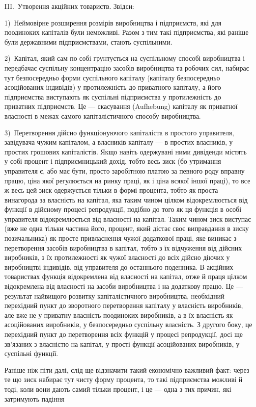 \parcont{}  %

III.~Утворення акційних товариств. Звідси:

1)~Неймовірне розширення розмірів виробництва і підприємств, які для поодиноких капіталів були
неможливі. Разом з тим
такі підприємства, які раніше були державними підприємствами,
стають суспільними.

2)~Капітал, який сам по собі грунтується на суспільному
способі виробництва і передбачає суспільну концентрацію засобів виробництва та робочих сил, набирає
тут безпосередньо
форми суспільного капіталу (капіталу безпосередньо асоційованих індивідів) у протилежність до
приватного капіталу, а його
підприємства виступають як суспільні підприємства у протилежність до приватних підприємств. Це —
скасування (Aufhebung)
капіталу як приватної власності в межах самого капіталістичного способу виробництва.

3)~Перетворення дійсно функціонуючого капіталіста в простого управителя, завідувача чужим капіталом,
а власників
капіталу — в простих власників, у простих грошових капіталістів. Якщо навіть одержувані ними
дивіденди містять у собі
процент і підприємницький дохід, тобто весь зиск (бо утримання управителя є, або має бути, просто
заробітною платою за
певного роду вправну працю, ціна якої регулюється на ринку
праці, як і ціна всякої іншої праці), то все ж весь цей зиск
одержується тільки в формі процента, тобто як проста винагорода за власність на капітал, яка таким
чином цілком відокремлюється від функції в дійсному процесі репродукції, подібно
до того як ця функція в особі управителя відокремлюється від
власності на капітал. Таким чином зиск виступає (вже не одна
тільки частина його, процент, який дістає своє виправдання
в зиску позичальника) як просте привласнення чужої додаткової
праці, яке виникає з перетворення засобів виробництва в капітал, тобто з їх відчуження від дійсних
виробників, з їх протилежності як чужої власності до всіх дійсно діючих у виробництві індивідів, від
управителя до останнього поденника.
В акційних товариствах функція відокремлена від власності на
капітал, отже й праця цілком відокремлена від власності на
засоби виробництва і на додаткову працю. Це — результат найвищого розвитку капіталістичного
виробництва, необхідний
перехідний пункт до зворотного перетворення капіталу у власність виробників, але вже не у приватну
власність поодиноких
виробників, а в їх власність як асоційованих виробників, у безпосередньо суспільну власність. З
другого боку, це перехідний пункт до перетворення всіх функцій у процесі репродукції,
досі ще зв’язаних з власністю на капітал, у прості функції асоційованих виробників, у суспільні
функції.

Раніше ніж піти далі, слід ще відзначити такий економічно
важливий факт: через те що зиск набирає тут чисту форму процента, то такі підприємства можливі й
тоді, коли вони дають самий
тільки процент, і це — одна з тих причин, які затримують падіння
\parbreak{}  %
